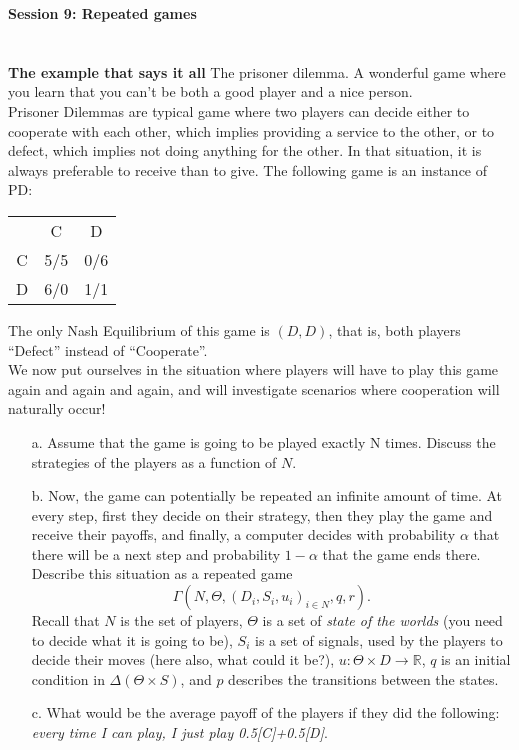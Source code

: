 \documentclass{../ape}
\newcommand{\reels}{\mathbb{R}}
\begin{document}
{
  \Large
  \textbf{Session 9: Repeated games}
}

\section{}
\textbf{The example that says it all}
The prisoner dilemma. A wonderful game where you learn that you can't be both a good player and a nice person.  \\
Prisoner Dilemmas are typical game where two players can decide either to cooperate with each other, which implies providing a service to the other, or to defect, which implies not doing anything for the other. In that situation, it is always preferable to receive than to give. The following game is an instance of PD:
\begin{center}
\begin{tabular}{c|cc}
& C & D \\
C & 5/5 & 0/6 \\
D & 6/0 & 1/1
\end{tabular}
\end{center}
The only Nash Equilibrium of this game is $(D,D)$, that is, both players ``Defect'' instead of ``Cooperate''.\\
We now put ourselves in the situation where players will have to play this game again and again and again, and will investigate scenarios where cooperation will naturally occur!
\begin{enumerate}
	\item[a.] Assume that the game is going to be played exactly N times. Discuss the strategies of the players as a function of $N$. 
	\item[b.] Now, the game can potentially be repeated an infinite amount of time. At every step, first they decide on their strategy, then they play the game and receive their payoffs, and finally, a computer decides with probability $\alpha$ that there will be a next step and probability $1-\alpha$ that the game ends there.\\
	Describe this situation as a repeated game $$\Gamma(N, \Theta, (D_i, S_i, u_i)_{i \in N}, q, r).$$
	Recall that $N$ is the set of players, $\Theta$ is a set of \emph{state of the worlds} (you need to decide what it is going to be), $S_i$ is a set of signals, used by the players to decide their moves (here also, what could it be?), $u : \Theta \times D \rightarrow \reels$, $q$ is an initial condition in $\Delta( \Theta \times S)$, and $p$ describes the transitions between the states.
		\item[c.] What would be the average payoff of the players if they did the following:
		\emph{every time I can play, I just play 0.5[C]+0.5[D]}. 
\end{enumerate}
\end{document}
